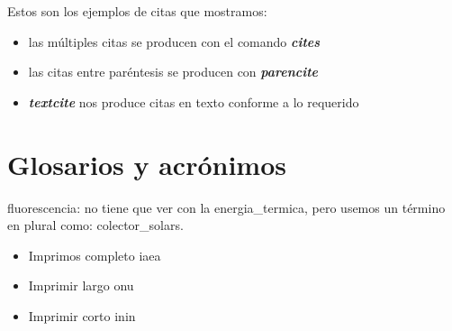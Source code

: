 \documentclass[12pt]{report}
\begin{document}
		Estos son los ejemplos de citas que mostramos: 
		\begin{itemize}
			\item las múltiples citas se producen con el comando \textbf{\textit{cites}} \cites{nadeeshani_nicotinamide_2022}{kalogirou_solar_2004}
			\item las citas entre paréntesis se producen con \textbf{\textit{parencite}} \parencite{kalogirou_solar_2004}
			\item \textbf{\textit{textcite}} nos produce citas en texto conforme a lo requerido
		\end{itemize}
		
		\section{Glosarios y acrónimos}
			\Gls{fluorescencia}: no tiene que ver con la \gls{energia_termica}, pero usemos un término en plural como: \glspl{colector_solar}.
			
			\begin{itemize}
				\item Imprimos completo \acrfull{iaea}
				\item Imprimir largo \acrlong{onu}
				\item Imprimir corto \acrshort{inin}
			\end{itemize}
				
	\printbibliography[heading=bibintoc]
\end{document}
